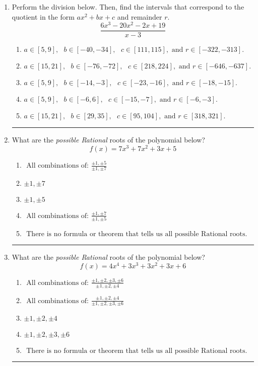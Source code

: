 \documentclass[14pt]{extbook}
\newcommand{\litem}[1]{\item#1\hspace*{-1cm}\rule{\textwidth}{0.4pt}}
\begin{document}
\begin{enumerate}
{\begin{enumerate}[label=\Alph*.]
\end{enumerate} }
\litem{
Perform the division below. Then, find the intervals that correspond to the quotient in the form $ax^2+bx+c$ and remainder $r$.\[ \frac{6x^{3} -20 x^{2} -2 x + 19}{x -3} \]\begin{enumerate}[label=\Alph*.]
\item \( a \in [5, 9], \text{   } b \in [-40, -34], \text{   } c \in [111, 115], \text{   and   } r \in [-322, -313]. \)
\item \( a \in [15, 21], \text{   } b \in [-76, -72], \text{   } c \in [218, 224], \text{   and   } r \in [-646, -637]. \)
\item \( a \in [5, 9], \text{   } b \in [-14, -3], \text{   } c \in [-23, -16], \text{   and   } r \in [-18, -15]. \)
\item \( a \in [5, 9], \text{   } b \in [-6, 6], \text{   } c \in [-15, -7], \text{   and   } r \in [-6, -3]. \)
\item \( a \in [15, 21], \text{   } b \in [29, 35], \text{   } c \in [95, 104], \text{   and   } r \in [318, 321]. \)

\end{enumerate} }
\litem{
What are the \textit{possible Rational} roots of the polynomial below?\[ f(x) = 7x^{3} +7 x^{2} +3 x + 5 \]\begin{enumerate}[label=\Alph*.]
\item \( \text{ All combinations of: }\frac{\pm 1,\pm 5}{\pm 1,\pm 7} \)
\item \( \pm 1,\pm 7 \)
\item \( \pm 1,\pm 5 \)
\item \( \text{ All combinations of: }\frac{\pm 1,\pm 7}{\pm 1,\pm 5} \)
\item \( \text{ There is no formula or theorem that tells us all possible Rational roots.} \)

\end{enumerate} }
\litem{
What are the \textit{possible Rational} roots of the polynomial below?\[ f(x) = 4x^{4} +3 x^{3} +3 x^{2} +3 x + 6 \]\begin{enumerate}[label=\Alph*.]
\item \( \text{ All combinations of: }\frac{\pm 1,\pm 2,\pm 3,\pm 6}{\pm 1,\pm 2,\pm 4} \)
\item \( \text{ All combinations of: }\frac{\pm 1,\pm 2,\pm 4}{\pm 1,\pm 2,\pm 3,\pm 6} \)
\item \( \pm 1,\pm 2,\pm 4 \)
\item \( \pm 1,\pm 2,\pm 3,\pm 6 \)
\item \( \text{ There is no formula or theorem that tells us all possible Rational roots.} \)


\end{enumerate}}
\end{enumerate}
\end{document}
